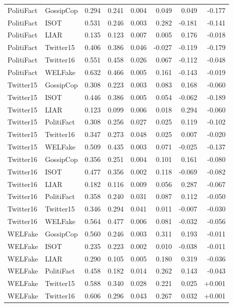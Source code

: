 \begin{longtable}{@{}llrrrrrr@{}}
PolitiFact & GossipCop & 0.294 & 0.241 & 0.004 & 0.049 & 0.049 & -0.177 \\
PolitiFact & ISOT & 0.531 & 0.246 & 0.003 & 0.282 & -0.181 & -0.141 \\
PolitiFact & LIAR & 0.135 & 0.123 & 0.007 & 0.005 & 0.176 & -0.018 \\
PolitiFact & Twitter15 & 0.406 & 0.386 & 0.046 & -0.027 & -0.119 & -0.179 \\
PolitiFact & Twitter16 & 0.551 & 0.458 & 0.026 & 0.067 & -0.112 & -0.048 \\
PolitiFact & WELFake & 0.632 & 0.466 & 0.005 & 0.161 & -0.143 & -0.019 \\
Twitter15 & GossipCop & 0.308 & 0.223 & 0.003 & 0.083 & 0.168 & -0.060 \\
Twitter15 & ISOT & 0.446 & 0.386 & 0.005 & 0.054 & -0.062 & -0.189 \\
Twitter15 & LIAR & 0.123 & 0.099 & 0.006 & 0.018 & 0.294 & -0.060 \\
Twitter15 & PolitiFact & 0.308 & 0.256 & 0.027 & 0.025 & 0.119 & -0.102 \\
Twitter15 & Twitter16 & 0.347 & 0.273 & 0.048 & 0.025 & 0.007 & -0.020 \\
Twitter15 & WELFake & 0.509 & 0.435 & 0.003 & 0.071 & -0.025 & -0.137 \\
Twitter16 & GossipCop & 0.356 & 0.251 & 0.004 & 0.101 & 0.161 & -0.080 \\
Twitter16 & ISOT & 0.477 & 0.356 & 0.002 & 0.118 & -0.069 & -0.082 \\
Twitter16 & LIAR & 0.182 & 0.116 & 0.009 & 0.056 & 0.287 & -0.067 \\
Twitter16 & PolitiFact & 0.358 & 0.240 & 0.031 & 0.087 & 0.112 & -0.050 \\
Twitter16 & Twitter15 & 0.346 & 0.294 & 0.041 & 0.011 & -0.007 & -0.030 \\
Twitter16 & WELFake & 0.564 & 0.477 & 0.006 & 0.081 & -0.032 & -0.056 \\
WELFake & GossipCop & 0.560 & 0.246 & 0.003 & 0.311 & 0.193 & -0.011 \\
WELFake & ISOT & 0.235 & 0.223 & 0.002 & 0.010 & -0.038 & -0.011 \\
WELFake & LIAR & 0.290 & 0.105 & 0.005 & 0.180 & 0.319 & -0.036 \\
WELFake & PolitiFact & 0.458 & 0.182 & 0.014 & 0.262 & 0.143 & -0.043 \\
WELFake & Twitter15 & 0.588 & 0.340 & 0.028 & 0.221 & 0.025 & +0.001 \\
WELFake & Twitter16 & 0.606 & 0.296 & 0.043 & 0.267 & 0.032 & +0.001 \\
\bottomrule
\end{longtable}
